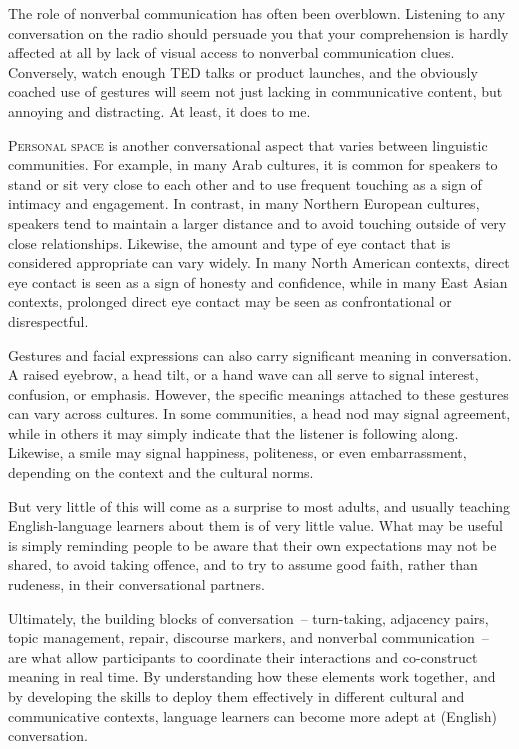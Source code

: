 The role of nonverbal communication has often been overblown. Listening to any conversation on the radio should persuade you that your comprehension is hardly affected at all by lack of visual access to nonverbal communication clues. Conversely, watch enough TED talks or product launches, and the obviously coached use of gestures will seem not just lacking in communicative content, but annoying and distracting. At least, it does to me.

\textsc{Personal space} is another conversational aspect that varies between linguistic communities. For example, in many Arab cultures, it is common for speakers to stand or sit very close to each other and to use frequent touching as a sign of intimacy and engagement. In contrast, in many Northern European cultures, speakers tend to maintain a larger distance and to avoid touching outside of very close relationships. Likewise, the amount and type of eye contact that is considered appropriate can vary widely. In many North American contexts, direct eye contact is seen as a sign of honesty and confidence, while in many East Asian contexts, prolonged direct eye contact may be seen as confrontational or disrespectful.

Gestures and facial expressions can also carry significant meaning in conversation. A raised eyebrow, a head tilt, or a hand wave can all serve to signal interest, confusion, or emphasis. However, the specific meanings attached to these gestures can vary across cultures. In some communities, a head nod may signal agreement, while in others it may simply indicate that the listener is following along. Likewise, a smile may signal happiness, politeness, or even embarrassment, depending on the context and the cultural norms.

But very little of this will come as a surprise to most adults, and usually teaching English-language learners about them is of very little value. What may be useful is simply reminding people to be aware that their own expectations may not be shared, to avoid taking offence, and to try to assume good faith, rather than rudeness, in their conversational partners.

Ultimately, the building blocks of conversation~-- turn-taking, adjacency pairs, topic management, repair, discourse markers, and nonverbal communication~-- are what allow participants to coordinate their interactions and co-construct meaning in real time. By understanding how these elements work together, and by developing the skills to deploy them effectively in different cultural and communicative contexts, language learners can become more adept at (English) conversation.

